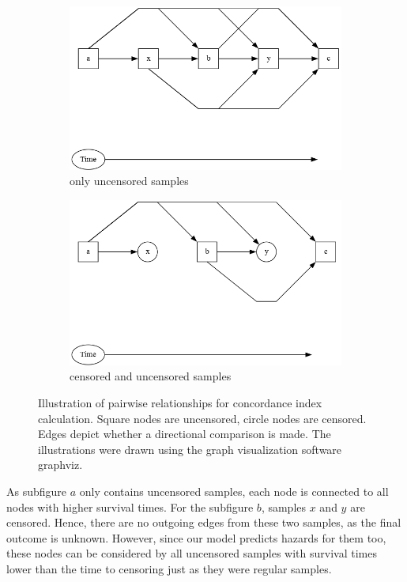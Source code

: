 \begin{figure}[h!t]
     \centering
     \begin{subfigure}[b]{0.49\textwidth}
         \centering
         \includegraphics[width=\textwidth]{latex/figures/C-Index_uncensored.png}
         \caption{only uncensored samples}
         \label{fig:uncensored}
     \end{subfigure}
     \hfill
     \begin{subfigure}[b]{0.49\textwidth}
         \centering
         \includegraphics[width=\textwidth]{latex/figures/C-Index_censored_noz.png}
         \caption{censored and uncensored samples}
         \label{fig:censored}
     \end{subfigure}
     \caption[Concordance Index Diagram]{Illustration of pairwise relationships for concordance index calculation. Square nodes are uncensored, circle nodes are censored. Edges depict whether a directional comparison is made. The illustrations were drawn using the graph visualization software graphviz. \cite{Gansner2000Open}
     }
\end{figure}
As subfigure $a$ only contains uncensored samples, each node is connected to all nodes with higher survival times. For the subfigure \(b\), samples $x$ and $y$ are censored. Hence, there are no outgoing edges from these two samples, as the final outcome is unknown. However, since our model predicts hazards for them too, these nodes can be considered by all uncensored samples with survival times lower than the time to censoring just as they were regular samples. 

